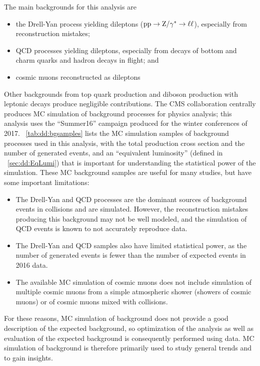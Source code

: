 The main backgrounds for this analysis are
\begin{itemize}
  \item the Drell-Yan process yielding dileptons ($\mathrm{p}\mathrm{p}\to\mathrm{Z}/\gamma^* \to \ell\ell$), especially from reconstruction mistakes;
  \item QCD processes yielding dileptons, especially from decays of bottom and charm quarks and hadron decays in flight; and
  \item cosmic muons reconstructed as dileptons
\end{itemize}
Other backgrounds from top quark production and diboson production with leptonic decays produce negligible contributions.
The CMS collaboration centrally produces MC simulation of background processes for physics analysis; this analysis uses the ``Summer16'' campaign produced for the winter conferences of 2017.
\Tab~\ref{tab:dd:bgsamples} lists the MC simulation samples of background processes used in this analysis, with the total production cross section and the number of generated events, and an ``equivalent luminosity'' (defined in \Sec~\ref{sec:dd:EqLumi}) that is important for understanding the statistical power of the simulation.
These MC background samples are useful for many studies, but have some important limitations:
\begin{itemize}
  \item The Drell-Yan and QCD processes are the dominant sources of background events in \pp collisions and are simulated. However, the reconstruction mistakes producing this background may not be well modeled, and the simulation of QCD events is known to not accurately reproduce data.
  \item The Drell-Yan and QCD samples also have limited statistical power, as the number of generated events is fewer than the number of expected events in 2016 data.
  \item The available MC simulation of cosmic muons does not include simulation of multiple cosmic muons from a simple atmospheric shower (showers of cosmic muons) or of cosmic muons mixed with \pp collisions.
\end{itemize}
For these reasons, MC simulation of background does not provide a good description of the expected background, so optimization of the analysis as well as evaluation of the expected background is consequently performed using data.
MC simulation of background is therefore primarily used to study general trends and to gain insights.

